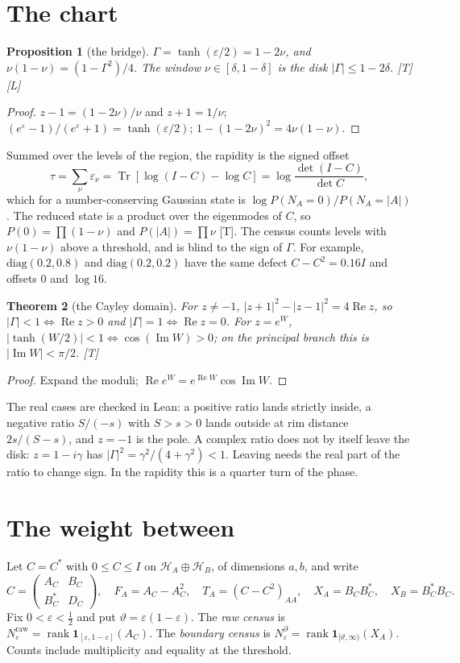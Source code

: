 \documentclass[11pt]{article}
\newtheorem{theorem}{Theorem}[section]
\newtheorem{proposition}[theorem]{Proposition}
\theoremstyle{definition}
\newcommand{\grade}[1]{\textsf{\small[#1]}}
\newcommand{\Tr}{\operatorname{Tr}}
\newcommand{\Rea}{\operatorname{Re}}
\newcommand{\Ima}{\operatorname{Im}}
\newcommand{\rank}{\operatorname{rank}}
\begin{document}
\section{The chart}\label{sec:chart}
\begin{proposition}[the bridge]\label{prop:bridge}
$\Gamma=\tanh(\varepsilon/2)=1-2\nu$, and $\nu(1-\nu)=(1-\Gamma^2)/4$. The window $\nu\in[\delta,1-\delta]$ is the disk $|\Gamma|\le1-2\delta$. \grade{T}\grade{L}
\end{proposition}
\begin{proof}
$z-1=(1-2\nu)/\nu$ and $z+1=1/\nu$; $(e^\varepsilon-1)/(e^\varepsilon+1)=\tanh(\varepsilon/2)$; $1-(1-2\nu)^2=4\nu(1-\nu)$.
\end{proof}
Summed over the levels of the region, the rapidity is the signed offset
\begin{equation}\label{eq:offset}
\tau=\sum_\nu\varepsilon_\nu=\Tr[\log(I-C)-\log C]=\log\frac{\det(I-C)}{\det C},
\end{equation}
which for a number-conserving Gaussian state is $\log P(N_A=0)/P(N_A=|A|)$. The reduced state is a product over the eigenmodes of $C$, so $P(0)=\prod(1-\nu)$ and $P(|A|)=\prod\nu$ \grade{T}. The census counts levels with $\nu(1-\nu)$ above a threshold, and is blind to the sign of $\Gamma$. For example, $\mathrm{diag}(0.2,0.8)$ and $\mathrm{diag}(0.2,0.2)$ have the same defect $C-C^2=0.16I$ and offsets $0$ and $\log16$.

\begin{theorem}[the Cayley domain]\label{thm:cayley}
For $z\ne-1$, $|z+1|^2-|z-1|^2=4\Rea z$, so $|\Gamma|<1\iff\Rea z>0$ and $|\Gamma|=1\iff\Rea z=0$. For $z=e^W$, $|\tanh(W/2)|<1\iff\cos(\Ima W)>0$; on the principal branch this is $|\Ima W|<\pi/2$. \grade{T}
\end{theorem}
\begin{proof}
Expand the moduli; $\Rea e^W=e^{\Rea W}\cos\Ima W$.
\end{proof}
The real cases are checked in Lean: a positive ratio lands strictly inside, a negative ratio $S/(-s)$ with $S>s>0$ lands outside at rim distance $2s/(S-s)$, and $z=-1$ is the pole. A complex ratio does not by itself leave the disk: $z=1-i\gamma$ has $|\Gamma|^2=\gamma^2/(4+\gamma^2)<1$. Leaving needs the real part of the ratio to change sign. In the rapidity this is a quarter turn of the phase.

\section{The weight between}\label{sec:weight}
Let $C=C^*$ with $0\le C\le I$ on $\mathcal H_A\oplus\mathcal H_B$, of dimensions $a,b$, and write
\[
C=\begin{pmatrix}A_C&B_C\\B_C^*&D_C\end{pmatrix},\quad F_A=A_C-A_C^2,\quad T_A=(C-C^2)_{AA},\quad X_A=B_CB_C^*,\quad X_B=B_C^*B_C.
\]
Fix $0<\varepsilon<\tfrac12$ and put $\vartheta=\varepsilon(1-\varepsilon)$. The \emph{raw census} is $N^{\mathrm{raw}}_\varepsilon=\rank\mathbf 1_{[\varepsilon,1-\varepsilon]}(A_C)$. The \emph{boundary census} is $N^\partial_\varepsilon=\rank\mathbf 1_{[\vartheta,\infty)}(X_A)$. Counts include multiplicity and equality at the threshold.
\end{document}
